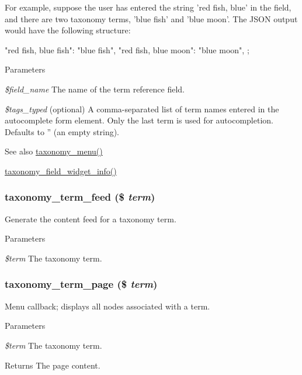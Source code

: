 For example, suppose the user has entered the string 'red fish, blue' in the field, and there are two taxonomy terms, 'blue fish' and 'blue moon'. The JSON output would have the following structure: 
\begin{DoxyCode}
   {
     "red fish, blue fish": "blue fish",
     "red fish, blue moon": "blue moon",
   };
\end{DoxyCode}



\begin{DoxyParams}{Parameters}
\item[{\em \$field\_\-name}]The name of the term reference field. \item[{\em \$tags\_\-typed}](optional) A comma-\/separated list of term names entered in the autocomplete form element. Only the last term is used for autocompletion. Defaults to '' (an empty string).\end{DoxyParams}
\begin{DoxySeeAlso}{See also}
\hyperlink{taxonomy_8module_a256fff9f5fb7e3f68d2cb9e82d35b68c}{taxonomy\_\-menu()} 

\hyperlink{taxonomy_8module_ad6d45fa8106c7ee50059ebf9e89b9268}{taxonomy\_\-field\_\-widget\_\-info()} 
\end{DoxySeeAlso}
\hypertarget{taxonomy_8pages_8inc_a8400d3de3b78abc951c0e1c6657c8fc1}{
\subsubsection[{taxonomy\_\-term\_\-feed}]{\setlength{\rightskip}{0pt plus 5cm}taxonomy\_\-term\_\-feed (\$ {\em term})}}
\label{taxonomy_8pages_8inc_a8400d3de3b78abc951c0e1c6657c8fc1}
Generate the content feed for a taxonomy term.


\begin{DoxyParams}{Parameters}
\item[{\em \$term}]The taxonomy term. \end{DoxyParams}
\hypertarget{taxonomy_8pages_8inc_a43b5178b66864e214a43196bd7b15c91}{
\subsubsection[{taxonomy\_\-term\_\-page}]{\setlength{\rightskip}{0pt plus 5cm}taxonomy\_\-term\_\-page (\$ {\em term})}}
\label{taxonomy_8pages_8inc_a43b5178b66864e214a43196bd7b15c91}
Menu callback; displays all nodes associated with a term.


\begin{DoxyParams}{Parameters}
\item[{\em \$term}]The taxonomy term. \end{DoxyParams}
\begin{DoxyReturn}{Returns}
The page content. 
\end{DoxyReturn}
